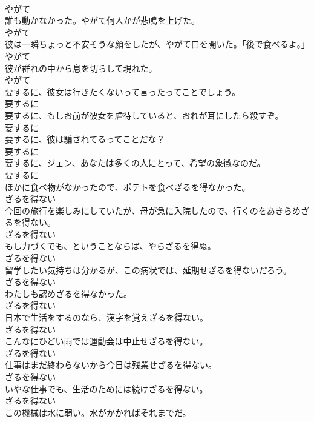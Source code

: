 \documentclass[8pt]{extreport}
\begin{document}
\begin{CJK}{UTF8}{min}
\\	やがて	
\\	誰も動かなかった。やがて何人かが悲鳴を上げた。	
\\	やがて	
\\	彼は一瞬ちょっと不安そうな顔をしたが、やがて口を開いた。「後で食べるよ。」	
\\	やがて	
\\	彼が群れの中から息を切らして現れた。	
\\	やがて	
\\	要するに、彼女は行きたくないって言ったってことでしょう。	
\\	要するに	
\\	要するに、もしお前が彼女を虐待していると、おれが耳にしたら殺すぞ。	
\\	要するに	
\\	要するに、彼は騙されてるってことだな？	
\\	要するに	
\\	要するに、ジェン、あなたは多くの人にとって、希望の象徴なのだ。	
\\	要するに	
\\	ほかに食べ物がなかったので、ポテトを食べざるを得なかった。	
\\	ざるを得ない	
\\	今回の旅行を楽しみにしていたが、母が急に入院したので、行くのをあきらめざるを得ない。	
\\	ざるを得ない	
\\	もし力づくでも、ということならば、やらざるを得ぬ。	
\\	ざるを得ない	
\\	留学したい気持ちは分かるが、この病状では、延期せざるを得ないだろう。	
\\	ざるを得ない	
\\	わたしも認めざるを得なかった。	
\\	ざるを得ない	
\\	日本で生活をするのなら、漢字を覚えざるを得ない。	
\\	ざるを得ない	
\\	こんなにひどい雨では運動会は中止せざるを得ない。	
\\	ざるを得ない	
\\	仕事はまだ終わらないから今日は残業せざるを得ない。	
\\	ざるを得ない	
\\	いやな仕事でも、生活のためには続けざるを得ない。	
\\	ざるを得ない	
\\	この機械は水に弱い。水がかかればそれまでだ。	

\end{CJK}
\end{document}
